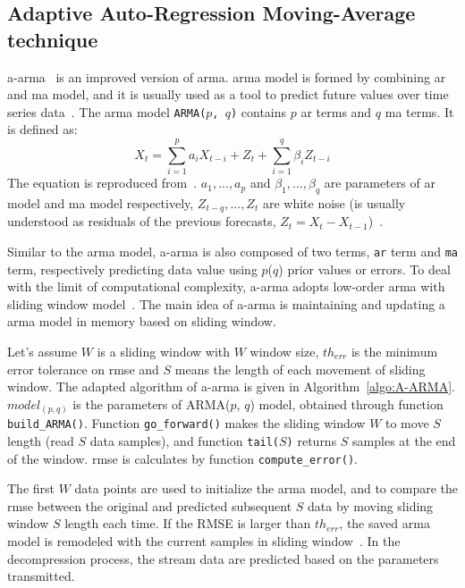 \subsection{Adaptive Auto-Regression Moving-Average technique}


\acrfull{a-arma}~\cite{lu2010optimized} is an improved version of
\acrfull{arma}. \acrshort{arma} model is formed by combining \acrshort{ar} and
\acrshort{ma} model, and it is usually used as a tool to predict future values
over time series data~\cite{chatfield2016analysis}. The \acrshort{arma} model
\texttt{ARMA($p$, $q$)} contains $p$ \acrshort{ar} terms and $q$ \acrshort{ma}
terms. It is defined as:
\begin{equation}
X_t = \sum_{i=1}^{p}a_{i}X_{t-i} + Z_t + \sum_{i=1}^{q}\beta_{i}Z_{t-i}
\end{equation}
\noindent The equation is reproduced from~\cite{chatfield2016analysis}.
$a_1, ..., a_p$ and $\beta_1, ..., \beta_q$ are parameters of \acrshort{ar}
model and \acrshort{ma} model respectively, $Z_{t-q}, ...,Z_{t}$ are white noise
(is usually understood as residuals of the previous forecasts, $Z_t = X_t -
X_{t-1}$)~\cite{chatfield2016analysis}.

Similar to the \acrshort{arma} model, \acrshort{a-arma} is also composed of two
terms, \texttt{\acrshort{ar}} term and \texttt{\acrshort{ma}} term, respectively
predicting data value using $p$($q$) prior values or errors. To deal with the
limit of computational complexity, \acrshort{a-arma} adopts low-order
\acrshort{arma} with sliding window model~\cite{lu2010optimized}. The main idea
of \acrshort{a-arma} is maintaining and updating a \acrshort{arma} model in
memory based on sliding window.

Let's assume $W$ is a sliding window with $W$ window size, $th_{err}$ is the
minimum error tolerance on \acrfull{rmse} and $S$ means the length of each
movement of sliding window. The adapted algorithm of \acrshort{a-arma} is given
in Algorithm~\ref{algo:A-ARMA}. $model_{(p, q)}$ is the parameters of ARMA($p$,
$q$) model, obtained through function \texttt{build\_ARMA()}. Function
\texttt{go\_forward()} makes the sliding window $W$ to move $S$ length (read $S$
data samples), and function \texttt{tail($S$)} returns $S$ samples at the end of
the window. \acrshort{rmse} is calculates by function \texttt{compute\_error()}.

The first $W$ data points are used to initialize the \acrshort{arma} model, and
to compare the \acrshort{rmse} between the original and predicted subsequent $S$
data by moving sliding window $S$ length each time. If the RMSE is larger than
$th_{err}$, the saved \acrshort{arma} model is remodeled with the current
samples in sliding window~\cite{lu2010optimized}. In the decompression process,
the stream data are predicted based on the parameters transmitted.


